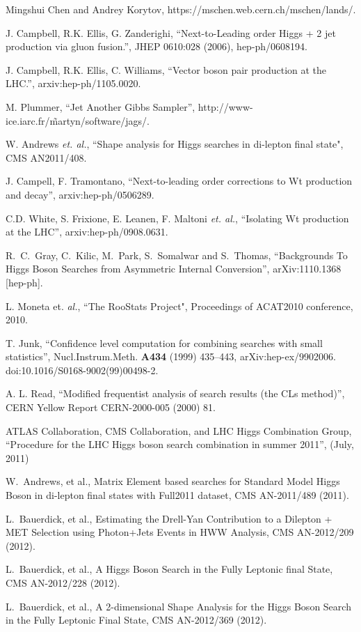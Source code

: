 Mingshui Chen and Andrey Korytov, https://mschen.web.cern.ch/mschen/lands/.

J. Campbell, R.K. Ellis, G. Zanderighi, ``Next-to-Leading order Higgs + 2 jet production via gluon fusion.'', JHEP 0610:028 (2006), hep-ph/0608194.

J. Campbell, R.K. Ellis, C. Williams, ``Vector boson pair production at the LHC.'', arxiv:hep-ph/1105.0020.

M. Plummer, ``Jet Another Gibbs Sampler'', http://www-ice.iarc.fr/\~martyn/software/jags/.

W. Andrews {\it et. al.}, ``Shape analysis for Higgs searches in di-lepton final state", 
CMS AN2011/408.

J. Campell, F. Tramontano, ``Next-to-leading order corrections to Wt production and decay'', arxiv:hep-ph/0506289.

C.D. White, S. Frixione, E. Leanen, F. Maltoni {\it et. al.}, ``Isolating Wt production at the LHC'', arxiv:hep-ph/0908.0631.

  R.~C.~Gray, C.~Kilic, M.~Park, S.~Somalwar and S.~Thomas,
  ``Backgrounds To Higgs Boson Searches from Asymmetric Internal Conversion'',
  arXiv:1110.1368 [hep-ph].

L. Moneta et. {\it al.}, ``The RooStats Project", Proceedings of ACAT2010 conference, 2010.

T. Junk, ``Confidence level computation for combining searches with small statistics'', 
Nucl.Instrum.Meth. {\bf A434} (1999) 435–443, arXiv:hep-ex/9902006. 
doi:10.1016/S0168-9002(99)00498-2.

A. L. Read, ``Modified frequentist analysis of search results (the CLs method)'', 
CERN Yellow Report CERN-2000-005 (2000) 81.

ATLAS Collaboration, CMS Collaboration, and LHC Higgs Combination Group, 
``Procedure for the LHC Higgs boson search combination in summer 2011'', (July, 2011)

W.~Andrews, et al., {Matrix Element based searches for Standard Model Higgs Boson in di-lepton final states with Full2011 dataset}, CMS AN-2011/489 (2011).

L.~Bauerdick, et al., {Estimating the Drell-Yan Contribution to a Dilepton + MET Selection using Photon+Jets Events in HWW Analysis}, CMS AN-2012/209 (2012).

L.~Bauerdick, et al., {A Higgs Boson Search in the Fully Leptonic \WW final State}, CMS AN-2012/228 (2012).

L.~Bauerdick, et al., {A 2-dimensional Shape Analysis for the Higgs Boson Search in the Fully Leptonic \WW Final State}, CMS AN-2012/369 (2012).
